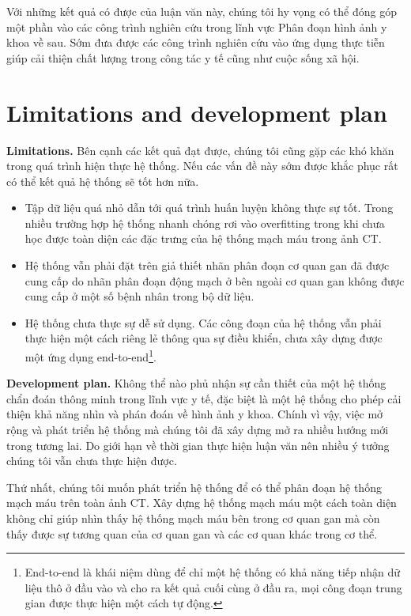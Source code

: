 	 Với những kết quả có được của luận văn này, chúng tôi hy vọng có thể đóng góp một phần vào các công trình nghiên cứu trong lĩnh vực Phân đoạn hình ảnh y khoa về sau. Sớm đưa được các công trình nghiên cứu vào ứng dụng thực tiễn giúp cải thiện chất lượng trong công tác y tế cũng như cuộc sống xã hội.

\newpage
\section{Limitations and development plan}
\label{sec:limits_and_plan}
	\textbf{Limitations.\hspace{3mm}} Bên cạnh các kết quả đạt được, chúng tôi cũng gặp các khó khăn trong quá trình hiện thực hệ thống. Nếu các vấn đề này sớm được khắc phục rất có thể kết quả hệ thống sẽ tốt hơn nữa.
	\begin{itemize}
		\item Tập dữ liệu quá nhỏ dẫn tới quá trình huấn luyện không thực sự tốt. Trong nhiều trường hợp hệ thống nhanh chóng rơi vào overfitting trong khi chưa học được toàn diện các đặc trưng của hệ thống mạch máu trong ảnh CT.
		\item Hệ thống vẫn phải đặt trên giả thiết nhãn phân đoạn cơ quan gan đã được cung cấp do nhãn phân đoạn động mạch ở bên ngoài cơ quan gan không được cung cấp ở một số bệnh nhân trong bộ dữ liệu.
		\item Hệ thống chưa thực sự dễ sử dụng. Các công đoạn của hệ thống vẫn phải thực hiện một cách riêng lẻ thông qua sự điều khiển, chưa xây dựng được một ứng dụng end-to-end\footnote{End-to-end là khái niệm dùng để chỉ một hệ thống có khả năng tiếp nhận dữ liệu thô ở đầu vào và cho ra kết quả cuối cùng ở đầu ra, mọi công đoạn trung gian được thực hiện một cách tự động.}.
	\end{itemize}

	\textbf{Development plan.\hspace{3mm}} Không thể nào phủ nhận sự cần thiết của một hệ thống chẩn đoán thông minh trong lĩnh vực y tế, đặc biệt là một hệ thống cho phép cải thiện khả năng nhìn và phán đoán về hình ảnh y khoa. Chính vì vậy, việc mở rộng và phát triển hệ thống mà chúng tôi đã xây dựng mở ra nhiều hướng mới trong tương lai. Do giới hạn về thời gian thực hiện luận văn nên nhiều ý tưởng chúng tôi vẫn chưa thực hiện được.
	
	Thứ nhất, chúng tôi muốn phát triển hệ thống để có thể phân đoạn hệ thống mạch máu trên toàn ảnh CT. Xây dựng hệ thống mạch máu một cách toàn diện không chỉ giúp nhìn thấy hệ thống mạch máu bên trong cơ quan gan mà còn thấy được sự tương quan của cơ quan gan và các cơ quan khác trong cơ thể.
	
